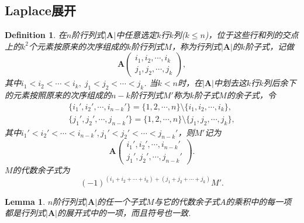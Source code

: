 \documentclass{article}
\newtheorem{lemma}[theorem]{Lemma}
\newtheorem{definition}[theorem]{Definition}
\newcommand{\mbf}[1]{\mathbf{#1}}
\begin{document}
\newpage
\subsection{Laplace展开}
\begin{definition}
\rm 在$n$阶行列式$|\mbf{A}|$中任意选定$k$行$k$列($k \leq n$)，位于这些行和列的交点上的$k^2$个元素按原来的次序组成的$k$阶行列式$M$，称为行列式$|\mbf{A}|$的{\color{red}$k$阶子式}，记做
$$
\mbf{A}\begin{pmatrix}
i_1,i_2,\cdots,i_k \\
j_1,j_2,\cdots,j_k
\end{pmatrix},
$$
其中$i_1 < i_2 < \cdots < i_k,\; j_1 < j_2 < \cdots < j_k$. 当$k < n$时，在$|\mbf{A}|$中划去这$k$行$k$列后余下的元素按照原来的次序组成的$n-k$阶行列式$M'$称为{\color{red}$k$阶子式$M$的余子式}，令
$$
\begin{array}{ll}
\{i_1',i_2',\cdots, i_{n-k}'\} = \{1,2,\cdots,n\}\setminus\{i_1,i_2,\cdots,i_k\}, \\
\{j_1',j_2',\cdots, j_{n-k}'\} = \{1,2,\cdots,n\}\setminus\{j_1,j_2,\cdots,j_k\},
\end{array}
$$
其中$i_1'< i_2'<\cdots < i_{n-k}',j_1' < j_2' < \cdots < j_{n-k}'$，则$M'$记为
$$
\mbf{A}\begin{pmatrix}
i_1',i_2',\cdots, i_{n-k}' \\
j_1',j_2',\cdots, j_{n-k}'
\end{pmatrix}.
$$
{\color{red}$M$的代数余子式}为
$$
(-1)^{(i_1+i_2+\cdots+i_k) + (j_1+j_2+\cdots+j_k)}M'.
$$
\end{definition}

\begin{lemma}\label{laplace: l1}
\rm $n$阶行列式$|\mbf{A}|$的任一个子式$M$与它的代数余子式$A$的乘积中的每一项都是行列式$|\mbf{A}|$的展开式中的一项，而且符号也一致.
\end{lemma}
\end{document}
